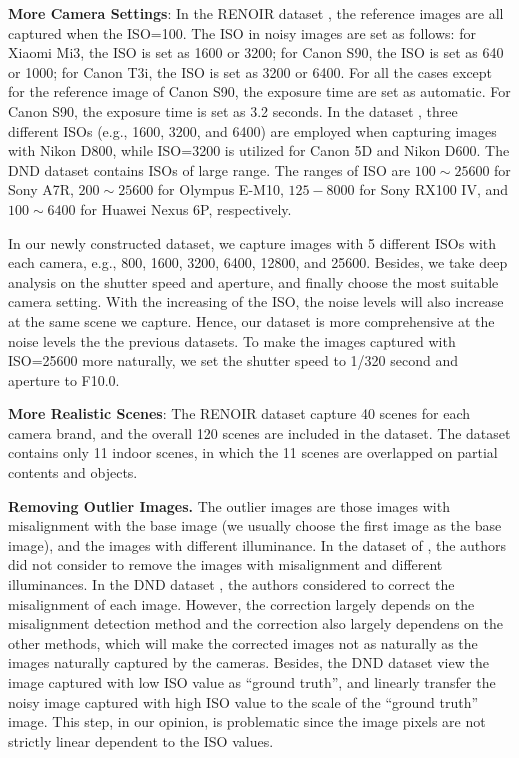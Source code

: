\textbf{More Camera Settings}: In the RENOIR dataset \cite{RENOIR2014}, the reference images are all captured when the ISO=100. The ISO in noisy images are set as follows:  for Xiaomi Mi3, the ISO is set as 1600 or 3200; for Canon S90, the ISO is set as 640 or 1000; for Canon T3i, the ISO is set as 3200 or 6400. For all the cases except for the reference image of Canon S90, the exposure time are set as automatic. For Canon S90, the exposure time is set as 3.2 seconds. In the dataset \cite{crosschannel2016}, three different ISOs (e.g., 1600, 3200, and 6400) are employed when capturing images with Nikon D800, while ISO=3200 is utilized for Canon 5D and Nikon D600. The DND dataset \cite{dnd2017} contains ISOs of large range. The ranges of ISO are $100\sim25600$ for Sony A7R, $200\sim25600$ for Olympus E-M10, $125-8000$ for Sony RX100 IV, and $100\sim6400$ for Huawei Nexus 6P, respectively. 

In our newly constructed dataset, we capture images with 5 different ISOs with each camera, e.g., 800, 1600, 3200, 6400, 12800, and 25600. Besides, we take deep analysis on the shutter speed and aperture, and finally choose the most suitable camera setting. With the increasing of the ISO, the noise levels will also increase at the same scene we capture. Hence, our dataset is more comprehensive at the noise levels the the previous datasets. To make the images captured with ISO=25600 more naturally, we set the shutter speed to 1/320 second and aperture to F10.0. 

\textbf{More Realistic Scenes}: The RENOIR dataset \cite{RENOIR2014} capture 40 scenes for each camera brand, and the overall 120 scenes are included in the dataset.  The dataset \cite{crosschannel2016} contains only 11 indoor scenes, in which the 11 scenes are overlapped on partial contents and objects. 

\textbf{Removing Outlier Images.} The outlier images are those images with misalignment with the base image (we usually choose the first image as the base image), and the images with different illuminance. In the dataset of \cite{crosschannel2016}, the authors did not consider to remove the images with misalignment and different illuminances. In the DND dataset \cite{dnd2017}, the authors considered to correct the misalignment of each image. However, the correction largely depends on the misalignment detection method and the correction also largely dependens on the other methods, which will make the corrected images not as naturally as the images naturally captured by the cameras. Besides, the DND dataset \cite{dnd2017} view the image captured with low ISO value as ``ground truth'', and linearly transfer the noisy image captured with high ISO value to the scale of the ``ground truth'' image. This step, in our opinion, is problematic since the image pixels are not strictly linear dependent to the ISO values. 
 
